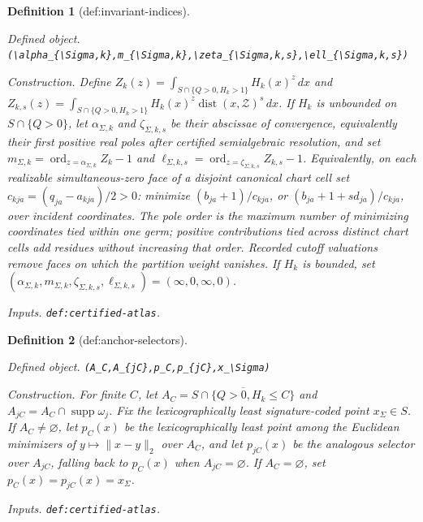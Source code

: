 \documentclass{article}
\newtheorem{definition}{Definition}
\begin{document}
\begin{definition}[def:invariant-indices]\label{def:invariant-indices}
\par\smallskip\noindent\emph{Defined object.} \texttt{(\textbackslash{}\allowbreak{}alpha\_\allowbreak{}\{\textbackslash{}\allowbreak{}Sigma,\allowbreak{}k\}\allowbreak{},\allowbreak{}m\_\allowbreak{}\{\textbackslash{}\allowbreak{}Sigma,\allowbreak{}k\}\allowbreak{},\allowbreak{}\textbackslash{}\allowbreak{}zeta\_\allowbreak{}\{\textbackslash{}\allowbreak{}Sigma,\allowbreak{}k,\allowbreak{}s\}\allowbreak{},\allowbreak{}\textbackslash{}\allowbreak{}ell\_\allowbreak{}\{\textbackslash{}\allowbreak{}Sigma,\allowbreak{}k,\allowbreak{}s\}\allowbreak{})}
\par\smallskip\noindent\emph{Construction.} Define \(Z_k(z)=\int_{S\cap\{Q>0,H_k>1\}}H_k(x)^z\,dx\) and \(Z_{k,s}(z)=\int_{S\cap\{Q>0,H_k>1\}}H_k(x)^z\operatorname{dist}(x,\mathcal Z)^s\,dx\). If \(H_k\) is unbounded on \(S\cap\{Q>0\}\), let \(\alpha_{\Sigma,k}\) and \(\zeta_{\Sigma,k,s}\) be their abscissae of convergence, equivalently their first positive real poles after certified semialgebraic resolution, and set \(m_{\Sigma,k}=\operatorname{ord}_{z=\alpha_{\Sigma,k}}Z_k-1\) and \(\ell_{\Sigma,k,s}=\operatorname{ord}_{z=\zeta_{\Sigma,k,s}}Z_{k,s}-1\). Equivalently, on each realizable simultaneous-zero face of a disjoint canonical chart cell set \(c_{kja}=(q_{ja}-a_{kja})/2>0\): minimize \((b_{ja}+1)/c_{kja}\), or \((b_{ja}+1+s d_{ja})/c_{kja}\), over incident coordinates. The pole order is the maximum number of minimizing coordinates tied within one germ; positive contributions tied across distinct chart cells add residues without increasing that order. Recorded cutoff valuations remove faces on which the partition weight vanishes. If \(H_k\) is bounded, set \((\alpha_{\Sigma,k},m_{\Sigma,k},\zeta_{\Sigma,k,s},\ell_{\Sigma,k,s})=(\infty,0,\infty,0)\).
\par\smallskip\noindent\emph{Inputs.} \texttt{def:\allowbreak{}certified-\allowbreak{}atlas}.
\end{definition}

\begin{definition}[def:anchor-selectors]\label{def:anchor-selectors}
\par\smallskip\noindent\emph{Defined object.} \texttt{(A\_\allowbreak{}C,\allowbreak{}A\_\allowbreak{}\{jC\}\allowbreak{},\allowbreak{}p\_\allowbreak{}C,\allowbreak{}p\_\allowbreak{}\{jC\}\allowbreak{},\allowbreak{}x\_\allowbreak{}\textbackslash{}\allowbreak{}Sigma)}
\par\smallskip\noindent\emph{Construction.} For finite \(C\), let \(A_C=\overline{S\cap\{Q>0,H_k\le C\}}\) and \(A_{jC}=A_C\cap\operatorname{supp}\omega_j\). Fix the lexicographically least signature-coded point \(x_\Sigma\in S\). If \(A_C\ne\varnothing\), let \(p_C(x)\) be the lexicographically least point among the Euclidean minimizers of \(y\mapsto\|x-y\|_2\) over \(A_C\), and let \(p_{jC}(x)\) be the analogous selector over \(A_{jC}\), falling back to \(p_C(x)\) when \(A_{jC}=\varnothing\). If \(A_C=\varnothing\), set \(p_C(x)=p_{jC}(x)=x_\Sigma\).
\par\smallskip\noindent\emph{Inputs.} \texttt{def:\allowbreak{}certified-\allowbreak{}atlas}.
\end{definition}
\end{document}
